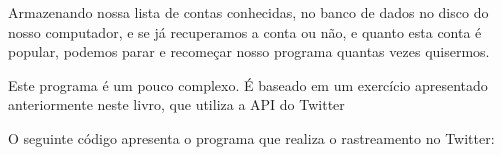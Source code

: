 
Armazenando nossa lista de contas conhecidas, no banco de dados no disco do
nosso computador, e se já recuperamos a conta ou não, e quanto esta conta é
popular, podemos parar e recomeçar nosso programa quantas vezes quisermos.


Este programa é um pouco complexo. É baseado em um exercício apresentado
anteriormente neste livro, que utiliza a API do Twitter


O seguinte código apresenta o programa que realiza o rastreamento no Twitter:

